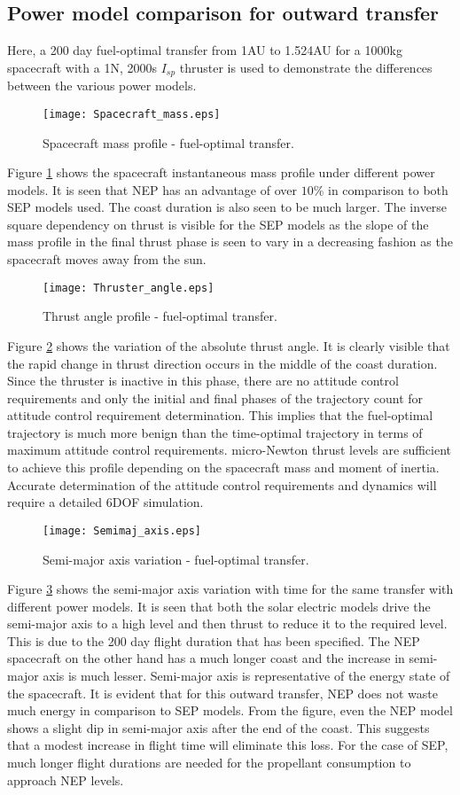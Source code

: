 \subsection{Power model comparison for outward transfer}
Here, a 200 day fuel-optimal transfer from 1AU to 1.524AU for a 1000kg spacecraft with a 1N, 2000s $I_{sp}$ thruster is used to demonstrate the differences between the various power models.
\begin{figure}[H]
	\centering\texttt{[image: Spacecraft\_mass.eps]}
	\caption{Spacecraft mass profile - fuel-optimal transfer.}
	\label{sc_massvar}
\end{figure}
Figure \ref{sc_massvar} shows the spacecraft instantaneous mass profile under different power models. It is seen that NEP has an advantage of over $10\%$ in comparison to both SEP models used. The coast duration is also seen to be much larger. The inverse square dependency on thrust is visible for the SEP models as the slope of the mass profile in the final thrust phase is seen to vary in a decreasing fashion as the spacecraft moves away from the sun.
\begin{figure}[H]
	\centering\texttt{[image: Thruster\_angle.eps]}
	\caption{Thrust angle profile - fuel-optimal transfer.}
	\label{sc_controlang}
\end{figure}
Figure \ref{sc_controlang} shows the variation of the absolute thrust angle. It is clearly visible that the rapid change in thrust direction occurs in the middle of the coast duration. Since the thruster is inactive in this phase, there are no attitude control requirements and only the initial and final phases of the trajectory count for attitude control requirement determination. This implies that the fuel-optimal trajectory is much more benign than the time-optimal trajectory in terms of maximum attitude control requirements. micro-Newton thrust levels are sufficient to achieve this profile depending on the spacecraft mass and moment of inertia. Accurate determination of the attitude control requirements and dynamics will require a detailed 6DOF simulation.
\begin{figure}[H]
	\centering\texttt{[image: Semimaj\_axis.eps]}
	\caption{Semi-major axis variation - fuel-optimal transfer.}
	\label{sc_semimaj}
\end{figure}
Figure \ref{sc_semimaj} shows the semi-major axis variation with time for the same transfer with different power models. It is seen that both the solar electric models drive the semi-major axis to a high level and then thrust to reduce it to the required level. This is due to the 200 day flight duration that has been specified. The NEP spacecraft on the other hand has a much longer coast and the increase in semi-major axis is much lesser. Semi-major axis is representative of the energy state of the spacecraft. It is evident that for this outward transfer, NEP does not waste much energy in comparison to SEP models. From the figure, even the NEP model shows a slight dip in semi-major axis after the end of the coast. This suggests that a modest increase in flight time will eliminate this loss. For the case of SEP, much longer flight durations are needed for the propellant consumption to approach NEP levels.

